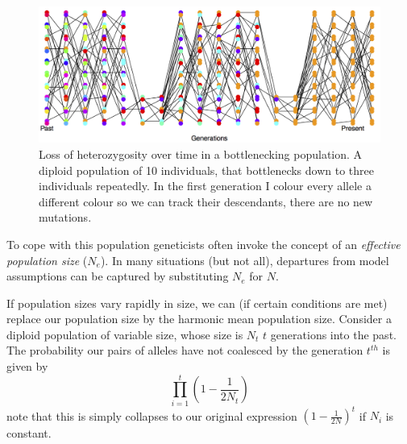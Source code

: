 \begin{figure}
\begin{center}
\includegraphics[width= \textwidth]{figures/Loss_of_he_col_alleles_varying_pop_dark.png}
\end{center}
\caption{Loss of heterozygosity over time in a bottlenecking population. A diploid population of 10 individuals, that bottlenecks
  down to three individuals repeatedly. In the first generation I colour every allele a different
colour so we can track their descendants, there are no new
  mutations.} \label{fig:LossHet_varying_pop}  
\end{figure} 


To cope with this population geneticists often invoke the concept of
an \emph{effective population size} ($N_e$). In many situations (but not all), departures from model assumptions can be captured by substituting $N_e$ for $N$.
\\


If population sizes vary rapidly in size, we can (if certain conditions are met)
replace our population size by the harmonic mean population size.
Consider a diploid population of variable size, whose size is $N_t$ $t$ generations into the
past. The probability our pairs of alleles have not coalesced by the generation $t^{th}$ is
given by
\begin{equation}
\prod_{i=1}^{t} \left(1-\frac{1}{2N_t} \right) \label{eqn:var_pop_coal}
\end{equation}
note that this is simply collapses to our original expression
$\left(1-\frac{1}{2N } \right)^t $ if $N_i$ is constant. 

